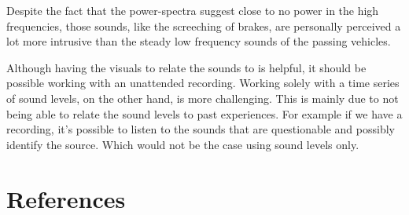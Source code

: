 \documentclass[twocolumn]{article}
\begin{document}
Despite the fact that the power-spectra suggest close to no power in the high frequencies,
those sounds, like the screeching of brakes, are personally perceived a lot more intrusive than the steady
low frequency sounds of the passing vehicles.

Although having the visuals to relate the sounds to is helpful, it should be possible working with an
unattended recording.
Working solely with a time series of sound levels, on the other hand, is more challenging.
This is mainly due to not being able to relate the sound levels to past experiences.
For example if we have a recording, it's possible to listen to the sounds that are
questionable and possibly identify the source.
Which would not be the case using sound levels only.

\section{References}
\end{document}
